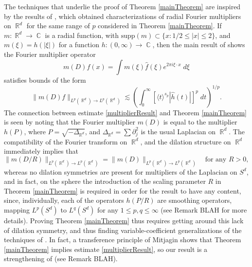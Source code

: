 \documentclass[dvipsnames,letterpaper,12pt]{article}
\DeclareMathOperator{\RR}{\mathbb{R}}
\DeclareMathOperator{\CC}{\mathbb{C}}
\begin{document}
The techniques that underlie the proof of Theorem \ref{mainTheorem} are inspired by the results of \cite{HeoandNazarovandSeeger}, which obtained characterizations of radial Fourier multipliers on $\RR^d$ for the same range of $p$ considered in Theorem \ref{mainTheorem}. If $m: \RR^d \to \CC$ is a radial function, with $\text{supp}(m) \subset \{ x : 1/2 \leq |x| \leq 2 \}$, and $m(\xi) = h(|\xi|)$ for a function $h: (0,\infty) \to \CC$, then the main result of \cite{HeoandNazarovandSeeger} shows the Fourier multiplier operator
%
\[ m(D) f (x) = \int m(\xi) \widehat{f}(\xi) e^{2 \pi i \xi \cdot x}\; d\xi \]
%
satisfies bounds of the form
%
\begin{equation} \label{multiplierResult}
    \| m(D) f \|_{L^p(\RR^d) \to L^p(\RR^d)} \lesssim \left( \int_0^\infty \left[ \langle t \rangle^{s_p} |\widehat{h}(t)| \right]^p\; dt \right)^{1/p}.
\end{equation}
%
The connection between estimate \eqref{multiplierResult} and Theorem \ref{mainTheorem} is seen by noting that the Fourier multiplier $m(D)$ is equal to the multiplier $h(P)$, where $P = \sqrt{-\Delta_{\RR^d}}$, and $\Delta_{\RR^d} = \sum \partial_j^2$ is the usual Laplacian on $\RR^d$. The compatibility of the Fourier transform on $\RR^d$, and the dilation structure on $\RR^d$ immediately implies that
%
\[ \| m(D/R) \|_{L^p(\RR^d) \to L^p(\RR^d)} = \| m(D) \|_{L^p(\RR^d) \to L^p(\RR^d)} \quad\text{for any $R > 0$}, \]
%
whereas no dilation symmetries are present for multipliers of the Laplacian on $S^d$, and in fact, on the sphere the introduction of the scaling parameter $R$ in Theorem \ref{mainTheorem} is required in order for the result to have any content, since, individually, each of the operators $h(P/R)$ are smoothing operators, mapping $L^p(S^d)$ to $L^q(S^d)$ for any $1 \leq p,q \leq \infty$ (see Remark BLAH for more details). Proving Theorem \ref{mainTheorem} thus requires getting around this lack of dilation symmetry, and thus finding variable-coefficient generalizations of the techniques of \cite{HeoandNazarovandSeeger}. In fact, a transference principle of Mitjagin shows that Theorem \ref{mainTheorem} implies estimate \eqref{multiplierResult}, so our result is a strengthening of  (see Remark BLAH).
\end{document}
